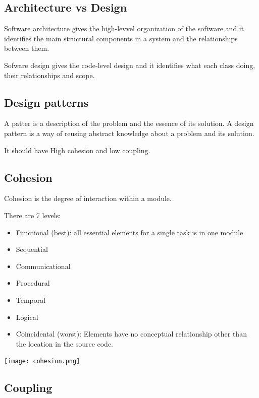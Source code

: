 \documentclass{article}
\begin{document}
    \subsection*{Architecture vs Design}

    Software architecture gives the high-levvel organization of the software and it 
    identifies the main structural components in a system and the relationships between 
    them.

    Sofware design gives the code-level design and it identifies what each class doing, 
    their relationships and scope.

    \subsection*{Design patterns}

    A patter is a description of the problem and the essence of its solution. A design 
    pattern is a way of reusing abstract knowledge about a problem and its solution. 

    It should have High cohesion and low coupling.

    \subsection*{Cohesion}

    Cohesion is the degree of interaction within a module.

    There are 7 levels:
    \begin{itemize}
        \item Functional (best): all essential elements for a single task is in one module 
        \item Sequential 
        \item Communicational 
        \item Procedural 
        \item Temporal 
        \item Logical 
        \item Coincidental (worst): Elements have no conceptual relationship other than the 
        location in the source code. 
    \end{itemize}

    \begin{center}
        \texttt{[image: cohesion.png]}
    \end{center}

    \subsection*{Coupling}
\end{document}
